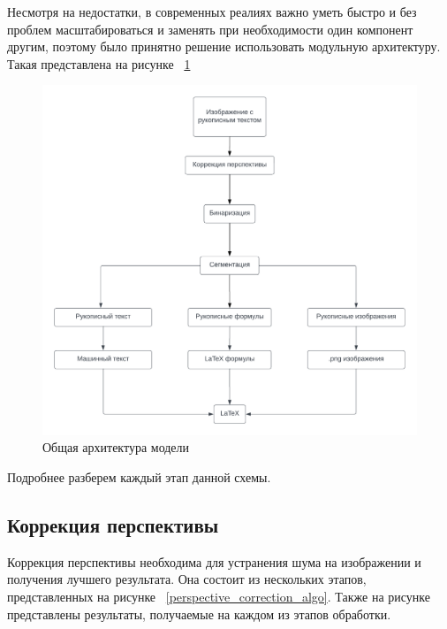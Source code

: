 Несмотря на недостатки, в современных реалиях важно уметь быстро и без проблем масштабироваться и заменять при необходимости один компонент другим, поэтому было принятно решение использовать модульную архитектуру.
Такая представлена на рисунке ~\ref{neuro_model}

\begin{figure}
\includegraphics[scale=0.75]{img/Blank_diagram.png}
\caption{Общая архитектура модели}
\label{neuro_model}
\end{figure}

Подробнее разберем каждый этап данной схемы.
\subsection{Коррекция перспективы}

Коррекция перспективы необходима для устранения шума на изображении и получения лучшего результата. Она состоит из нескольких этапов, представленных на рисунке ~\ref{perspective_correction_algo}. 
Также на рисунке представлены результаты, получаемые на каждом из этапов обработки.


